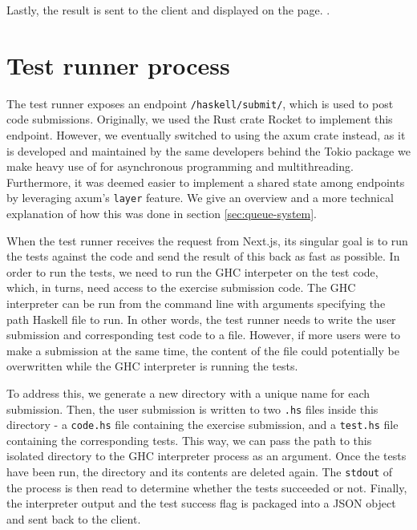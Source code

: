 Lastly, the result is sent to the client and displayed on the page.
.

\section{Test runner process} \label{sec:test_runner_process}
The test runner exposes an endpoint \texttt{/haskell/submit/}, which is used to post code submissions.
Originally, we used the Rust crate Rocket to implement this endpoint.
However, we eventually switched to using the axum crate instead, as it is developed and maintained by the same developers behind the Tokio package we make heavy use of for asynchronous programming and multithreading.
Furthermore, it was deemed easier to implement a shared state among endpoints by leveraging axum's \texttt{layer} feature.
We give an overview and a more technical explanation of how this was done in section \ref{sec:queue-system}.

When the test runner receives the request from Next.js, its singular goal is to run the tests against the code and send the result of this back as fast as possible.
In order to run the tests, we need to run the GHC interpeter on the test code, which, in turns, need access to the exercise submission code.
The GHC interpreter can be run from the command line with arguments specifying the path Haskell file to run.
In other words, the test runner needs to write the user submission and corresponding test code to a file.
However, if more users were to make a submission at the same time, the content of the file could potentially be overwritten while the GHC interpreter is running the tests.

To address this, we generate a new directory with a unique name for each submission.
Then, the user submission is written to two  \texttt{.hs} files inside this directory - a \texttt{code.hs} file containing the exercise submission, and a \texttt{test.hs} file containing the corresponding tests.
This way, we can pass the path to this isolated directory to the GHC interpreter process as an argument.
Once the tests have been run, the directory and its contents are deleted again.
The \texttt{stdout} of the process is then read to determine whether the tests succeeded or not.
Finally, the interpreter output and the test success flag is packaged into a JSON object and sent back to the client.


